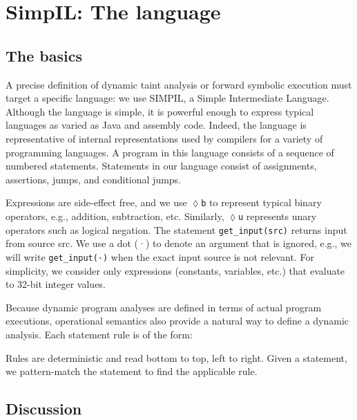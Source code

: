 \section{SimpIL: The language}
\subsection{The basics}
A precise definition of dynamic taint analysis or forward symbolic execution must target a specific language: we use SIMPIL, a Simple Intermediate Language. Although the language is simple, it is powerful enough to express typical languages as varied as Java and assembly code. Indeed, the language is representative of internal representations used by compilers for a variety of programming languages. A program in this language consists of a sequence of numbered statements. Statements in our language consist of assignments, assertions, jumps, and conditional jumps.

Expressions are side-effect free, and we use \texttt{$\lozenge$b} to represent typical binary operators, e.g., addition, subtraction, etc. Similarly, \texttt{$\lozenge$u} represents unary operators such as logical negation. The statement \texttt{get\_input(src)} returns input from source src. We use a dot (·) to denote an argument that is ignored, e.g., we will write \texttt{get\_input(·)} when the exact input source is not relevant. For simplicity, we consider only expressions (constants, variables, etc.) that evaluate to 32-bit integer values.

Because dynamic program analyses are defined in terms of actual program executions, operational semantics also provide a natural way to define a dynamic analysis. Each statement rule is of the form:
\begin{prooftree}
\end{prooftree}
Rules are deterministic and read bottom to top, left to right. Given a statement, we pattern-match the statement to find the applicable rule.

\subsection{Discussion}
